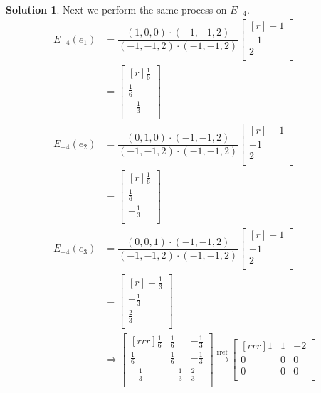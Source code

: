 \documentclass[12pt]{article}
\theoremstyle{definition}
\newtheorem*{solution}{Solution} %
\theoremstyle{plain}
\begin{document}
\begin{solution}
Next we perform the same process on $E_{-4}$.
\begin{align*}
E_{-4}(e_1) &= \dfrac{(1,0,0)\cdot (-1,-1,2)}{(-1,-1,2)\cdot (-1,-1,2)}\begin{bmatrix}[r]-1\\-1\\2\\\end{bmatrix}\\
&= \begin{bmatrix}[r]\frac{1}{6}\\\frac{1}{6}\\-\frac{1}{3}\\\end{bmatrix}\\
E_{-4}(e_2) &= \dfrac{(0,1,0)\cdot (-1,-1,2)}{(-1,-1,2)\cdot (-1,-1,2)}\begin{bmatrix}[r]-1\\-1\\2\\\end{bmatrix}\\
&= \begin{bmatrix}[r]\frac{1}{6}\\\frac{1}{6}\\-\frac{1}{3}\\\end{bmatrix}\\
E_{-4}(e_3) &= \dfrac{(0,0,1)\cdot (-1,-1,2)}{(-1,-1,2)\cdot (-1,-1,2)}\begin{bmatrix}[r]-1\\-1\\2\\\end{bmatrix}\\
&= \begin{bmatrix}[r]-\frac{1}{3}\\-\frac{1}{3}\\\frac{2}{3}\\\end{bmatrix}\\
&\Rightarrow \begin{bmatrix}[rrr]\frac{1}{6}&\frac{1}{6}&-\frac{1}{3}\\\frac{1}{6}&\frac{1}{6}&-\frac{1}{3}\\-\frac{1}{3}&-\frac{1}{3}&\frac{2}{3}\\\end{bmatrix} \xrightarrow[]{\mathrm{rref}} \begin{bmatrix}[rrr]1&1&-2\\0&0&0\\0&0&0\\\end{bmatrix}
\end{align*}
\end{solution}
\end{document}
